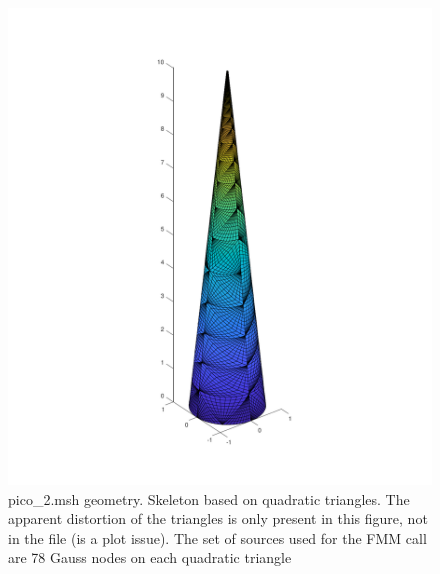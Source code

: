\documentclass[11pt, oneside]{article}   	%
\begin{document}
\begin{figure}[H]
\begin{center}
\includegraphics[width=6in]{pico_2_skeleton.pdf}
\end{center}
\caption{pico\_2.msh geometry. Skeleton based on quadratic triangles. The apparent distortion of the triangles is only present in this figure, not in the file (is a plot issue). The set of sources used for the FMM call are 78 Gauss nodes on each quadratic triangle}
\label{pico_2_skeleton}
\end{figure}
\end{document}
